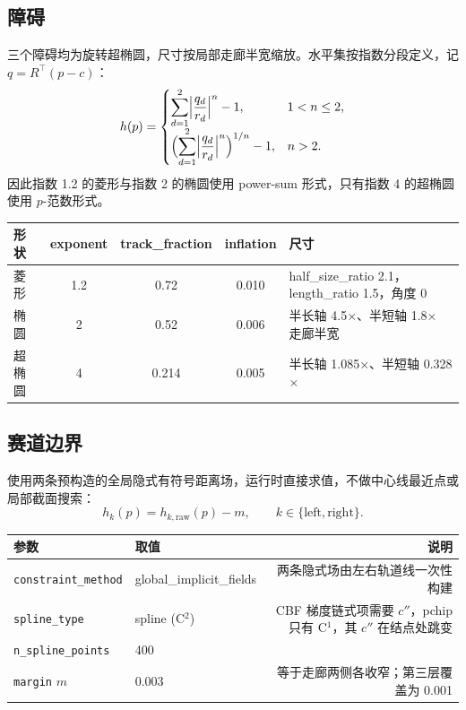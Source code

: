 \documentclass[11pt,a4paper]{ctexart}
\newcommand{\cf}[1]{\texttt{\small #1}}
\begin{document}
\subsection{障碍}
三个障碍均为旋转超椭圆，尺寸按局部走廊半宽缩放。水平集按指数分段定义，记 $q=R^{\!\top}(p-c)$：
\[
h(p)=
\begin{cases}
\displaystyle\sum_{d=1}^{2}\Bigl|\frac{q_d}{r_d}\Bigr|^{n}-1, & 1<n\le 2,\\[2ex]
\displaystyle\Bigl(\sum_{d=1}^{2}\Bigl|\frac{q_d}{r_d}\Bigr|^{n}\Bigr)^{1/n}-1, & n>2.
\end{cases}
\]
因此指数 1.2 的菱形与指数 2 的椭圆使用 power-sum 形式，只有指数 4 的超椭圆使用 $p$-范数形式。

\begin{center}
\small
\begin{tabular}{@{}lccc l@{}}
\toprule
\textbf{形状} & \textbf{exponent} & \textbf{track\_fraction} & \textbf{inflation} & \textbf{尺寸} \\
\midrule
菱形 & 1.2 & 0.72 & 0.010 & half\_size\_ratio 2.1，length\_ratio 1.5，角度 0 \\
椭圆 & 2 & 0.52 & 0.006 & 半长轴 4.5$\times$、半短轴 1.8$\times$ 走廊半宽 \\
超椭圆 & 4 & 0.214 & 0.005 & 半长轴 1.085$\times$、半短轴 0.328$\times$ \\
\bottomrule
\end{tabular}
\end{center}

\subsection{赛道边界}
使用两条预构造的全局隐式有符号距离场，运行时直接求值，不做中心线最近点或局部截面搜索：
\[
h_k(p)=h_{k,\mathrm{raw}}(p)-m,\qquad k\in\{\text{left},\text{right}\}.
\]

\begin{center}
\small
\begin{tabularx}{\textwidth}{@{}p{4.0cm}p{3.2cm}R@{}}
\toprule
\textbf{参数} & \textbf{取值} & \textbf{说明} \\
\midrule
\cf{constraint\_method} & global\_implicit\_fields & 两条隐式场由左右轨道线一次性构建 \\
\cf{spline\_type} & spline (C$^2$) & CBF 梯度链式项需要 $c''$，pchip 只有 C$^1$，其 $c''$ 在结点处跳变 \\
\cf{n\_spline\_points} & 400 & \\
\cf{margin} $m$ & 0.003 & 等于走廊两侧各收窄；第三层覆盖为 0.001 \\
\bottomrule
\end{tabularx}
\end{center}
\end{document}
